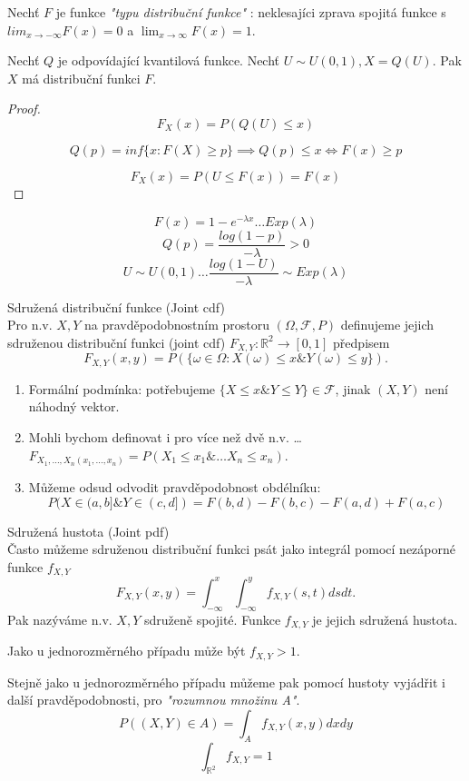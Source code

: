 \documentclass[../main.tex]{subfiles}
\begin{document}
\begin{theorem}
    Nechť $F$ je funkce \textit{"typu distribuční funkce"} : neklesajíci zprava spojitá funkce s $lim_{x\rightarrow -\infty} F(x) = 0$ a $\lim_{x \rightarrow \infty} F(x) = 1$.

    Nechť $Q$ je odpovídající kvantilová funkce. Nechť $U \sim U(0,1), X = Q(U)$. Pak $X$ má distribuční funkci $F$.
\end{theorem}
\begin{proof}
    \[F_X(x) = P(Q(U) \leq x)\]
    \begin{remark}
        \[Q(p) = inf\{x: F(X) \geq p\} \implies Q(p) \leq x \Leftrightarrow F(x) \geq p\]
    \end{remark}
    \[F_X(x) = P(U \leq F(x)) = F(x)\]
\end{proof}

\begin{example}
    \[F(x) = 1-e^{-\lambda x} \dots Exp(\lambda)\]
    \[Q(p) = \frac{log(1-p)}{-\lambda} > 0\]
    \[U \sim U(0,1) \dots \frac{log(1-U)}{-\lambda} \sim Exp(\lambda)\]
\end{example}

\begin{definition}
    Sdružená distribuční funkce (Joint cdf)\\

    Pro n.v. $X,Y$ na pravděpodobnostním prostoru $(\Omega,\mathcal{F},P)$ definujeme
    jejich sdruženou distribuční funkci (joint cdf) $F_{X,Y} : \mathbb{R}^2 \rightarrow [0,1]$ předpisem
    \[F_{X,Y}(x,y) = P(\{\omega \in \Omega : X(\omega) \leq x \& Y(\omega) \leq y\}).\]
    \begin{enumerate}
        \item Formální podmínka: potřebujeme $\{X\leq x \& Y \leq Y\} \in \mathcal{F}$, jinak $(X,Y)$ není náhodný vektor.
        \item Mohli bychom definovat i pro více než dvě n.v. \dots $F_{X_1,\dots ,X_n(x_1,\dots ,x_n)} = P(X_1 \leq x_1 \& \dots X_n \leq x_n)$.
        \item Můžeme odsud odvodit pravděpodobnost obdélníku:
        \[P(X \in (a,b] \& Y \in (c,d]) = F(b,d) - F(b,c) - F(a,d) + F(a,c)\]
    \end{enumerate}
\end{definition}

\begin{definition}
    Sdružená hustota (Joint pdf)\\

    Často můžeme sdruženou distribuční funkci psát jako integrál pomocí nezáporné funkce $f_{X,Y}$
    \[F_{X,Y}(x,y) = \int^x_{-\infty}\int^y_{-\infty} f_{X,Y}(s,t)dsdt.\]
    Pak nazýváme n.v. $X,Y$ sdruženě spojité. Funkce $f_{X,Y}$ je jejich sdružená hustota.

    Jako u jednorozměrného případu může být $f_{X,Y} > 1$.

    Stejně jako u jednorozměrného případu můžeme pak pomocí hustoty vyjádřit i další pravděpodobnosti,
    pro \textit{"rozumnou množinu A"}.
    \[P((X,Y)\in A) = \int_A f_{X,Y}(x,y)dxdy\]
    \[\int_{\mathbb{R}^2} f_{X,Y} = 1\]
\end{definition}
\end{document}
